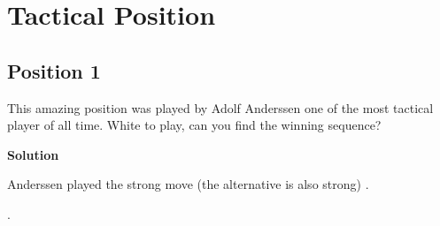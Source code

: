 \documentclass{article}
\begin{document}
\section{Tactical Position}

\subsection{Position 1}



This amazing position was played by Adolf Anderssen one of the most tactical player of all time. White to play, can you find the winning sequence?

\newgame




\begin{center}
\showboard
\end{center}

\textbf{Solution}

Anderssen played the strong move  (the alternative  is also strong) .

\begin{center}
\showboard
\end{center}
 
.


\begin{center}
\showboard
\end{center}
\end{document}
